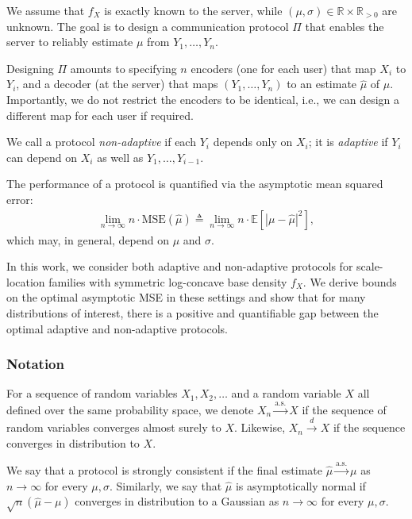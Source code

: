 \documentclass[10pt]{article} %
\theoremstyle{plain}
\theoremstyle{definition}
\theoremstyle{remark}
\newcommand{\bE}{\mathbb E}
\newcommand{\bR}{\mathbb R}
\newcommand{\as}{\text{a.s.}}
\begin{document}
We assume that $f_X$ is exactly known to the server, while $(\mu,\sigma) \in \bR \times \bR_{>0}$ are unknown. The goal is to design a communication protocol $\Pi$ that enables the server to reliably estimate \( \mu \) from \( Y_1,\ldots,Y_n \).  

Designing $\Pi$ amounts to specifying $n$ encoders (one for each user) that map $X_i$ to $Y_i$, and a decoder (at the server) that maps $(Y_1,\ldots,Y_n)$ to an estimate $\hat{\mu}$ of $\mu$. Importantly, we do not restrict the encoders to be identical, i.e., we can design a different map for each user if required.

\par We call a protocol \emph{non-adaptive} if each \( Y_i \) depends only on \( X_i \); it is \emph{adaptive} if \( Y_i \) can  depend on $X_i$ as well as \( Y_1,\ldots,Y_{i-1} \).  

\par The performance of a protocol is quantified via the asymptotic mean squared error:
\begin{align}\label{main:goal}
    \lim_{n\to\infty}n \cdot \mathrm{MSE}(\hat{\mu})\triangleq   \lim_{n \rightarrow \infty} n \cdot  \bE\left[ |\mu - \hat{\mu}|^2 \right],   
\end{align}
which may, in general, depend on $\mu$ and $\sigma$.

\par In this work, we consider both adaptive and non-adaptive protocols for scale-location families with symmetric log-concave base density $f_X$. We derive bounds on the optimal asymptotic MSE in these settings and show that for many distributions of interest, there is a positive and quantifiable gap between the optimal adaptive and non-adaptive protocols.



\subsubsection{Notation}
For a sequence of random variables $X_1,X_2,\ldots$ and a random variable $X$ all defined over the same probability space, we denote $X_n\xrightarrow{\as} X$ if the sequence of random variables converges almost surely to $X$. Likewise, $X_n\xrightarrow{d}X$ if the sequence converges in distribution to $X$.

We say that a protocol is strongly consistent if the final estimate $\hat{\mu}\xrightarrow{\as}\mu$ as $n\to\infty$ for every $\mu,\sigma$. Similarly, we say that $\hat{\mu}$ is asymptotically normal if $\sqrt{n}(\hat{\mu}-\mu)$ converges in distribution to a Gaussian as $n\to\infty$ for every $\mu,\sigma$.
\end{document}
